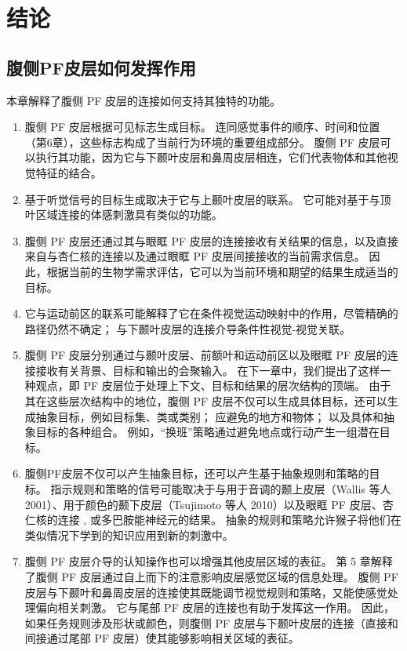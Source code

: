 \section{结论}
\subsection{腹侧PF皮层如何发挥作用}
\par
本章解释了腹侧 PF 皮层的连接如何支持其独特的功能。
\begin{enumerate}
\item 腹侧 PF 皮层根据可见标志生成目标。 
连同感觉事件的顺序、时间和位置（第6章），这些标志构成了当前行为环境的重要组成部分。 
腹侧 PF 皮层可以执行其功能，因为它与下颞叶皮层和鼻周皮层相连，它们代表物体和其他视觉特征的结合。
\item 基于听觉信号的目标生成取决于它与上颞叶皮层的联系。 
它可能对基于与顶叶区域连接的体感刺激具有类似的功能。
\item 腹侧 PF 皮层还通过其与眼眶 PF 皮层的连接接收有关结果的信息，以及直接来自与杏仁核的连接以及通过眼眶 PF 皮层间接接收的当前需求信息。 
因此，根据当前的生物学需求评估，它可以为当前环境和期望的结果生成适当的目标。
\item 它与运动前区的联系可能解释了它在条件视觉运动映射中的作用，尽管精确的路径仍然不确定； 与下颞叶皮层的连接介导条件性视觉-视觉关联。
\item 腹侧 PF 皮层分别通过与颞叶皮层、前额叶和运动前区以及眼眶 PF 皮层的连接接收有关背景、目标和输出的会聚输入。 
在下一章中，我们提出了这样一种观点，即 PF 皮层位于处理上下文、目标和结果的层次结构的顶端。 
由于其在这些层次结构中的地位，腹侧 PF 皮层不仅可以生成具体目标，还可以生成抽象目标，例如目标集、类或类别； 应避免的地方和物体； 以及具体和抽象目标的各种组合。 
例如，“换班”策略通过避免地点或行动产生一组潜在目标。
\item 腹侧PF皮层不仅可以产生抽象目标，还可以产生基于抽象规则和策略的目标。 
指示规则和策略的信号可能取决于与用于音调的颞上皮层（Wallis 等人 2001）、用于颜色的颞下皮层（Tsujimoto 等人 2010）以及眼眶 PF 皮层、杏仁核的连接 , 或多巴胺能神经元的结果。 
抽象的规则和策略允许猴子将他们在类似情况下学到的知识应用到新的刺激中。
\item 腹侧 PF 皮层介导的认知操作也可以增强其他皮层区域的表征。 
第 5 章解释了腹侧 PF 皮层通过自上而下的注意影响皮层感觉区域的信息处理。 
腹侧 PF 皮层与下颞叶和鼻周皮层的连接使其既能调节视觉规则和策略，又能使感觉处理偏向相关刺激。 
它与尾部 PF 皮层的连接也有助于发挥这一作用。 
因此，如果任务规则涉及形状或颜色，则腹侧 PF 皮层与下颞叶皮层的连接（直接和间接通过尾部 PF 皮层）使其能够影响相关区域的表征。
\end{enumerate}
